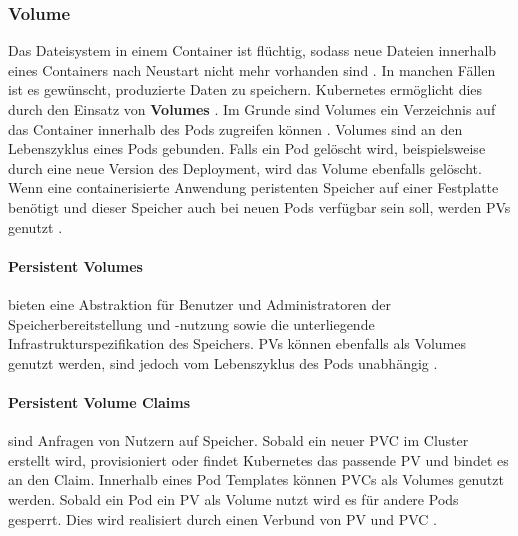 \subsubsection{Volume}
\label{subsec:kubernetes:volume}
Das Dateisystem in einem Container ist flüchtig, 
sodass neue Dateien innerhalb eines Containers nach Neustart nicht mehr vorhanden sind \cite{kubernetesVolumes}.
In manchen Fällen ist es gewünscht, produzierte Daten zu speichern.
Kubernetes ermöglicht dies durch den Einsatz von \textbf{Volumes} \cite{Marko2018}.
Im Grunde sind Volumes ein Verzeichnis auf das Container innerhalb des Pods zugreifen können \cite{kubernetesVolumes}.
Volumes sind an den Lebenszyklus eines Pods gebunden. Falls ein Pod gelöscht wird, beispielsweise durch eine neue Version des Deployment,
wird das Volume ebenfalls gelöscht.
Wenn eine containerisierte Anwendung peristenten Speicher auf einer Festplatte benötigt und dieser Speicher auch bei neuen Pods verfügbar sein soll,
werden \acfp{PV} genutzt \cite{Marko2018}.

\paragraph{Persistent Volumes}
bieten eine Abstraktion für Benutzer und Administratoren der Speicherbereitstellung und -nutzung sowie
die unterliegende Infrastrukturspezifikation des Speichers.
\acp{PV} können ebenfalls als Volumes genutzt werden,
sind jedoch vom Lebenszyklus des Pods unabhängig \cite{kubernetesPV}.

\paragraph{Persistent Volume Claims}
sind Anfragen von Nutzern auf Speicher. 
Sobald ein neuer \ac{PVC} im Cluster erstellt wird, provisioniert oder findet Kubernetes das
passende \ac{PV} und bindet es an den Claim.
Innerhalb eines Pod Templates können \acp{PVC} als Volumes genutzt werden.
Sobald ein Pod ein \ac{PV} als Volume nutzt wird es für andere Pods gesperrt. 
Dies wird realisiert durch einen Verbund von \ac{PV} und \ac{PVC} \cite{Marko2018}.
